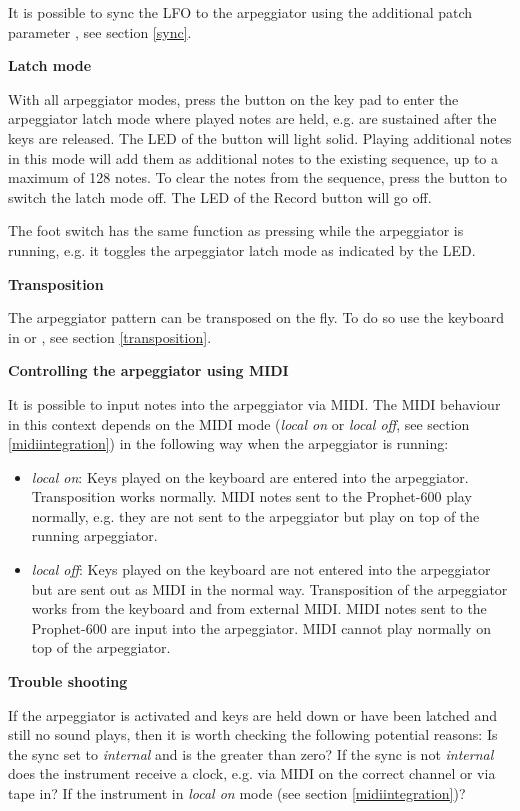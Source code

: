 It is possible to sync the LFO to the arpeggiator using the additional patch parameter \clocksync, see section \ref{sync}.

\textbf{Latch mode}

With all arpeggiator modes, press the \record button on the key pad to enter the arpeggiator latch mode where played notes are held, e.g. are sustained after the keys are released. The LED of the \record button will light solid. Playing additional notes in this mode will add them as additional notes to the existing sequence, up to a maximum of 128 notes. To clear the notes from the sequence, press the \record button to switch the latch mode off. The LED of the Record button will go off.

The foot switch has the same function as pressing \record while the arpeggiator is running, e.g. it toggles the arpeggiator latch mode as indicated by the \record LED. 

\textbf{Transposition}

The arpeggiator pattern can be transposed on the fly. To do so use the keyboard in \shiftmode or \shiftlock, see section \ref{transposition}.

\textbf{Controlling the arpeggiator using MIDI}

It is possible to input notes into the arpeggiator via MIDI. The MIDI behaviour in this context depends on the MIDI mode (\textit{local on} or \textit{local off}, see section \ref{midiintegration}) in the following way when the arpeggiator is running:

\begin{itemize}
  \item \textit{local on}: Keys played on the keyboard are entered into the arpeggiator. Transposition works normally. MIDI notes sent to the Prophet-600 play normally, e.g. they are not sent to the arpeggiator but play  on top of the running arpeggiator.
  \item \textit{local off}: Keys played on the keyboard are not entered into the arpeggiator but are sent out as MIDI in the normal way. Transposition of the arpeggiator works from the keyboard and from external MIDI. MIDI notes sent to the Prophet-600 are input into the arpeggiator. MIDI cannot play normally on top of the arpeggiator. 
\end{itemize}

\textbf{Trouble shooting}

If the arpeggiator is activated and keys are held down or have been latched and still no sound plays, then it is worth checking the following potential reasons: Is the sync set to \textit{internal} and is the \clock greater than zero? If the sync is not \textit{internal} does the instrument receive a clock, e.g. via MIDI on the correct channel or via tape in? If the instrument in \textit{local on} mode (see section \ref{midiintegration})?
